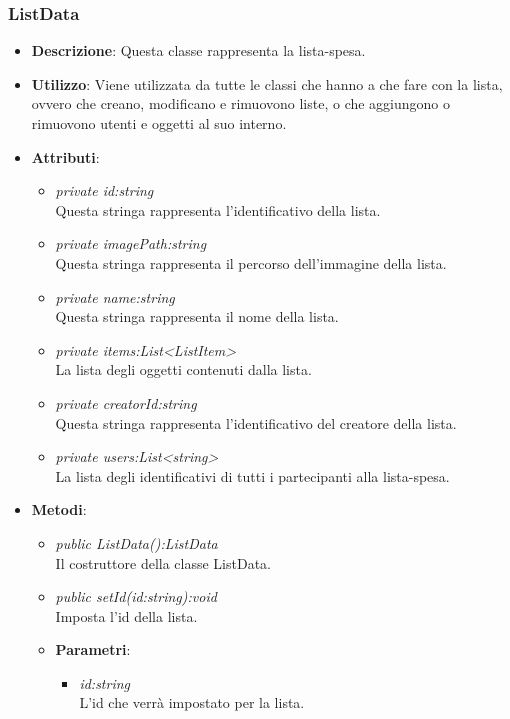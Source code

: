 \subsubsection{ListData}
\begin{itemize}
\item \textbf{Descrizione}: Questa classe rappresenta la lista-spesa.
\item \textbf{Utilizzo}: Viene utilizzata da tutte le classi che hanno a che fare con la lista, ovvero che creano, modificano e rimuovono liste, o che aggiungono o rimuovono utenti e oggetti al suo interno.
\item \textbf{Attributi}: 
	\begin{itemize}
	\item \textit{private id:string}\\
	Questa stringa rappresenta l'identificativo della lista.
	\item \textit{private imagePath:string}\\
	Questa stringa rappresenta il percorso dell'immagine della lista.
	\item \textit{private name:string}\\
	Questa stringa rappresenta il nome della lista.
	\item \textit{private items:List<ListItem>}\\
	La lista degli oggetti contenuti dalla lista.
	\item \textit{private creatorId:string}\\
	Questa stringa rappresenta l'identificativo del creatore della lista.
	\item \textit{private users:List<string>}\\
	La lista degli identificativi di tutti i partecipanti alla lista-spesa.
	\end{itemize}
\item \textbf{Metodi}:
	\begin{itemize}
	\item \textit{public ListData():ListData}\\
	Il costruttore della classe ListData.
	\item \textit{public setId(id:string):void}\\
	Imposta l'id della lista.
				\item{\textbf{Parametri}: \begin{itemize}
				\item \textit{id:string}\\
				L'id che verrà impostato per la lista.
			\end{itemize}}

\end{itemize}
\end{itemize}
